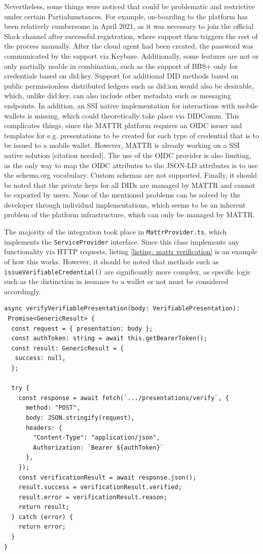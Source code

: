     Nevertheless, some things were noticed that could be problematic and restrictive under certain Partialumstances. For example, on-boarding to the platform has been relatively cumbersome in April 2021, as it was necessary to join the official Slack channel after successful registration, where support then triggers the rest of the process manually. After the cloud agent had been created, the password was communicated by the support via Keybase. Additionally, some features are not or only partially usable in combination, such as the support of BBS+ only for credentials based on did:key. Support for additional DID methods based on public permissionless distributed ledgers such as did:ion would also be desirable, which, unlike did:key, can also include other metadata such as messaging endpoints. In addition, an SSI native implementation for interactions with mobile wallets is missing, which could theoretically take place via DIDComm. This complicates things, since the MATTR platform requires an OIDC issuer and templates for e.g. presentations to be created for each type of credential that is to be issued to a mobile wallet. However, MATTR is already working on a \ac{SSI} native solution [citation needed]. The use of the OIDC provider is also limiting, as the only way to map the OIDC attributes to the JSON-LD attributes is to use the schema.org vocabulary. Custom schemas are not supported. Finally, it should be noted that the private keys for all \acp{DID} are managed by MATTR and cannot be exported by users. None of the mentioned problems can be solved by the developer through individual implementations, which seems to be an inherent problem of the platform infrastructure, which can only be managed by MATTR.
    
    The majority of the integration took place in \texttt{MattrProvider.ts}, which implements the \texttt{ServiceProvider} interface. Since this class implements any functionality via HTTP requests, listing \ref{listing: mattr verification} is an example of how this works. However, it should be noted that methods such as \texttt{issueVerifiableCredential()} are significantly more complex, as specific logic such as the distinction in issuance to a wallet or not must be considered accordingly.
    \newline
    
\begin{lstlisting}[style=ES6, caption=Example of mattr verification implementation, label={listing: mattr verification}]
async verifyVerifiablePresentation(body: VerifiablePresentation): 
 Promise<GenericResult> {
  const request = { presentation: body };
  const authToken: string = await this.getBearerToken();
  const result: GenericResult = {
   success: null,
  };

  try {
    const response = await fetch(`.../presentations/verify`, {
      method: "POST",
      body: JSON.stringify(request),
      headers: { 
        "Content-Type": "application/json", 
        Authorization: `Bearer ${authToken}` 
      },
    });
    const verificationResult = await response.json();
    result.success = verificationResult.verified;
    result.error = verificationResult.reason;
    return result;
  } catch (error) {
    return error;
  }
}\end{lstlisting}
    
